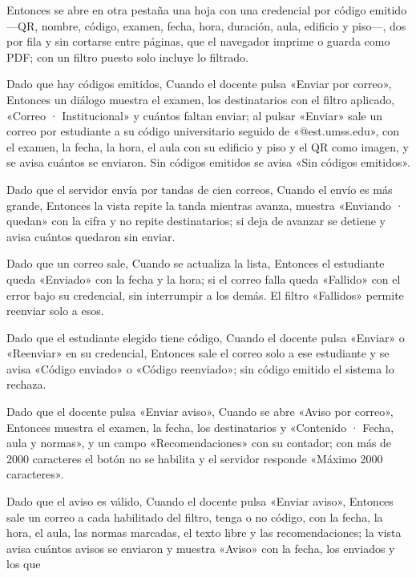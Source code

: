 {      Entonces se abre en otra pestaña una hoja con una credencial por código emitido
      ---QR, nombre, código, examen, fecha, hora, duración, aula, edificio y piso---, dos
      por fila y sin cortarse entre páginas, que el navegador imprime o guarda como PDF;
      con un filtro puesto solo incluye lo filtrado.
\item Dado que hay códigos emitidos, Cuando el docente pulsa «Enviar por correo»,
      Entonces un diálogo muestra el examen, los destinatarios con el filtro aplicado,
      «Correo · Institucional» y cuántos faltan enviar; al pulsar «Enviar» sale un correo
      por estudiante a su código universitario seguido de «@est.umss.edu», con el
      examen, la fecha, la hora, el aula con su edificio y piso y el QR como imagen, y se
      avisa cuántos se enviaron. Sin códigos emitidos se avisa «Sin códigos emitidos».
\item Dado que el servidor envía por tandas de cien correos, Cuando el envío es más
      grande, Entonces la vista repite la tanda mientras avanza, muestra «Enviando ·
      quedan» con la cifra y no repite destinatarios; si deja de avanzar se detiene y
      avisa cuántos quedaron sin enviar.
\item Dado que un correo sale, Cuando se actualiza la lista, Entonces el estudiante
      queda «Enviado» con la fecha y la hora; si el correo falla queda «Fallido» con el
      error bajo su credencial, sin interrumpir a los demás. El filtro «Fallidos» permite
      reenviar solo a esos.
\item Dado que el estudiante elegido tiene código, Cuando el docente pulsa «Enviar» o
      «Reenviar» en su credencial, Entonces sale el correo solo a ese estudiante y se
      avisa «Código enviado» o «Código reenviado»; sin código emitido el sistema lo
      rechaza.
\item Dado que el docente pulsa «Enviar aviso», Cuando se abre «Aviso por correo»,
      Entonces muestra el examen, la fecha, los destinatarios y «Contenido · Fecha, aula y
      normas», y un campo «Recomendaciones» con su contador; con más de 2000 caracteres el
      botón no se habilita y el servidor responde «Máximo 2000 caracteres».
\item Dado que el aviso es válido, Cuando el docente pulsa «Enviar aviso», Entonces sale
      un correo a cada habilitado del filtro, tenga o no código, con la fecha, la hora,
      el aula, las normas marcadas, el texto libre y las recomendaciones; la vista avisa
      cuántos avisos se enviaron y muestra «Aviso» con la fecha, los enviados y los que
}
